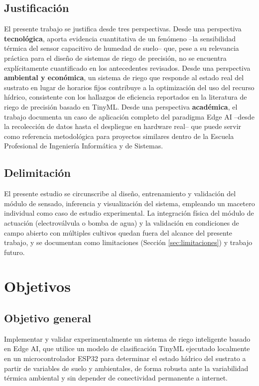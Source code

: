 \documentclass[12pt,a4paper]{article}
\begin{document}
\subsection{Justificación}
El presente trabajo se justifica desde tres perspectivas. Desde una perspectiva \textbf{tecnológica}, aporta evidencia cuantitativa de un fenómeno --la sensibilidad térmica del sensor capacitivo de humedad de suelo-- que, pese a su relevancia práctica para el diseño de sistemas de riego de precisión, no se encuentra explícitamente cuantificado en los antecedentes revisados. Desde una perspectiva \textbf{ambiental y económica}, un sistema de riego que responde al estado real del sustrato en lugar de horarios fijos contribuye a la optimización del uso del recurso hídrico, consistente con los hallazgos de eficiencia reportados en la literatura de riego de precisión basado en TinyML. Desde una perspectiva \textbf{académica}, el trabajo documenta un caso de aplicación completo del paradigma Edge AI --desde la recolección de datos hasta el despliegue en hardware real-- que puede servir como referencia metodológica para proyectos similares dentro de la Escuela Profesional de Ingeniería Informática y de Sistemas.

\subsection{Delimitación}
El presente estudio se circunscribe al diseño, entrenamiento y validación del módulo de sensado, inferencia y visualización del sistema, empleando un macetero individual como caso de estudio experimental. La integración física del módulo de actuación (electroválvula o bomba de agua) y la validación en condiciones de campo abierto con múltiples cultivos quedan fuera del alcance del presente trabajo, y se documentan como limitaciones (Sección \ref{sec:limitaciones}) y trabajo futuro.

\section{Objetivos}

\subsection{Objetivo general}
Implementar y validar experimentalmente un sistema de riego inteligente basado en Edge AI, que utilice un modelo de clasificación TinyML ejecutado localmente en un microcontrolador ESP32 para determinar el estado hídrico del sustrato a partir de variables de suelo y ambientales, de forma robusta ante la variabilidad térmica ambiental y sin depender de conectividad permanente a internet.
\end{document}
